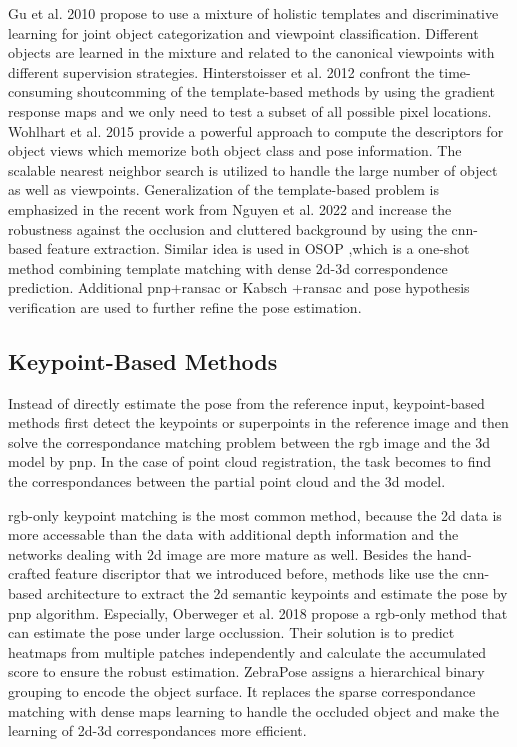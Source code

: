 \documentclass[12pt,DIV14,BCOR12mm,a4paper,footinclude=false,headinclude,parskip=half-,twoside,openright,cleardoublepage=empty,toc=index,bibliography=totoc,listof=totoc]{scrreprt}
\numberwithin{equation}{chapter}
\begin{document}
Gu et al. 2010 \cite{gu2010discriminative} propose to use a mixture of holistic templates and discriminative learning for joint object categorization and viewpoint classification. Different objects are learned in the mixture and related to the canonical viewpoints with different supervision strategies. Hinterstoisser et al. 2012 \cite{hinterstoisser2012gradient} confront the time-consuming shoutcomming of the template-based methods by using the gradient response maps and we only need to test a subset of all possible pixel locations. Wohlhart et al. 2015 \cite{Wohlhart_2015} provide a powerful approach to compute the descriptors for object views which memorize both object class and pose information. The scalable nearest neighbor search is utilized to handle the large number of object as well as viewpoints. Generalization of the template-based problem is emphasized in the recent work from Nguyen et al. 2022 \cite{nguyen2022templates} and increase the robustness against the occlusion and cluttered background by using the \gls{cnn}-based feature extraction. Similar idea is used in OSOP \cite{shugurov2022osop},which is a one-shot method combining template matching with dense \gls{2d}-\gls{3d} correspondence prediction. Additional \gls{pnp}+\gls{ransac} or Kabsch \cite{kabsch1976solution}+\gls{ransac} and pose hypothesis verification are used to further refine the pose estimation.
\subsection{Keypoint-Based Methods} 
Instead of directly estimate the pose from the reference input, keypoint-based methods first detect the keypoints or superpoints in the reference image and then solve the correspondance matching problem between the \gls{rgb} image and the \gls{3d} model by \gls{pnp}. In the case of point cloud registration, the task becomes to find the correspondances between the partial point cloud and the \gls{3d} model.

\gls{rgb}-only keypoint matching is the most common method, because the \gls{2d} data is more accessable than the data with additional depth information and the networks dealing with \gls{2d} image are more mature as well. Besides the hand-crafted feature discriptor that we introduced before, methods like \cite{pavlakos20176dof, rad2018bb8, pmlr-v87-tremblay18a,tekin2018realtime} use the \gls{cnn}-based architecture to extract the \gls{2d} semantic keypoints and estimate the pose by \gls{pnp} algorithm. Especially, Oberweger et al. 2018 \cite{oberweger2018making} propose a \gls{rgb}-only method that can estimate the pose under large occlussion. Their solution is to predict heatmaps from multiple patches independently and calculate the accumulated score to ensure the robust estimation. ZebraPose \cite{su2022zebrapose} assigns a hierarchical binary grouping to encode the object surface. It replaces the sparse correspondance matching with dense maps learning to handle the occluded object and make the learning of \gls{2d}-\gls{3d} correspondances more efficient.
\end{document}
